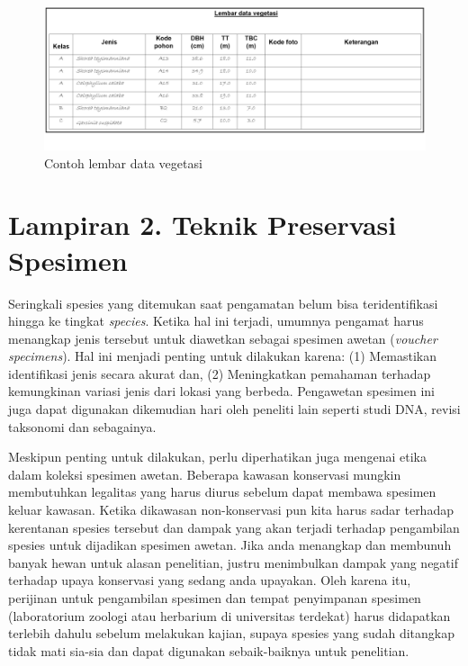 \documentclass[
  oneside]{book}
\begin{document}
\begin{figure}

{\centering \includegraphics[width=1\linewidth]{images/ldv_m} 

}

\caption{Contoh lembar data vegetasi}\label{fig:ldvm}
\end{figure}

\hypertarget{lampiran-2.-teknik-preservasi-spesimen}{%
\chapter*{Lampiran 2. Teknik Preservasi Spesimen}\label{lampiran-2.-teknik-preservasi-spesimen}}

Seringkali spesies yang ditemukan saat pengamatan belum bisa teridentifikasi hingga ke tingkat \emph{species}. Ketika hal ini terjadi, umumnya pengamat harus menangkap jenis tersebut untuk diawetkan sebagai spesimen awetan (\emph{voucher specimens}). Hal ini menjadi penting untuk dilakukan karena: (1) Memastikan identifikasi jenis secara akurat dan, (2) Meningkatkan pemahaman terhadap kemungkinan variasi jenis dari lokasi yang berbeda. Pengawetan spesimen ini juga dapat digunakan dikemudian hari oleh peneliti lain seperti studi DNA, revisi taksonomi dan sebagainya.

Meskipun penting untuk dilakukan, perlu diperhatikan juga mengenai etika dalam koleksi spesimen awetan. Beberapa kawasan konservasi mungkin membutuhkan legalitas yang harus diurus sebelum dapat membawa spesimen keluar kawasan. Ketika dikawasan non-konservasi pun kita harus sadar terhadap kerentanan spesies tersebut dan dampak yang akan terjadi terhadap pengambilan spesies untuk dijadikan spesimen awetan. Jika anda menangkap dan membunuh banyak hewan untuk alasan penelitian, justru menimbulkan dampak yang negatif terhadap upaya konservasi yang sedang anda upayakan. Oleh karena itu, perijinan untuk pengambilan spesimen dan tempat penyimpanan spesimen (laboratorium zoologi atau herbarium di universitas terdekat) harus didapatkan terlebih dahulu sebelum melakukan kajian, supaya spesies yang sudah ditangkap tidak mati sia-sia dan dapat digunakan sebaik-baiknya untuk penelitian.
\end{document}
